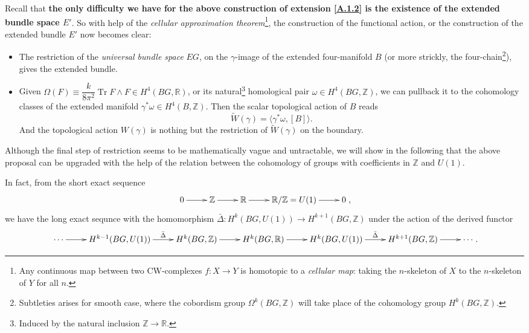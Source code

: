 \documentclass[10pt,nofootinbib,letterpaper]{revtex4}
\begin{document}
		Recall that \textbf{the only difficulty we have for the above construction of extension \eqref{A.1.2} is the existence of the extended bundle space $E'$}. So with help of the \emph{cellular approximation theorem}\footnote{Any continuous map between two CW-complexes $f:X\to Y$ is homotopic to a \emph{cellular map}: taking the $n$-skeleton of $X$ to the $n$-skeleton of $Y$ for all $n$.}, the construction of the functional action, or the construction of the extended bundle $E'$ now becomes clear:\par
		\begin{itemize}
			\item The restriction of the \emph{universal bundle space} $EG$, on the $\gamma$-image of the extended four-manifold $B$ (or more strickly, the four-chain\footnote{Subtleties arises for smooth case, where the cobordism group $\Omega^k(BG,\mathbb{Z})$ will take place of the cohomology group $H^k(BG,\mathbb{Z})$.}), gives the extended bundle. 
			\item Given $\Omega(F)\equiv\dfrac{k}{8\pi^2}\mathop{\mathrm{Tr}}F\wedge F\in H^4(BG,\mathbb{R})$, or its natural\footnote{Induced by the natural inclusion $\mathbb{Z}\rightarrow\mathbb{R}$.} homological pair $\omega\in H^4(BG,\mathbb{Z})$, we can pullback it to the cohomology classes of the extended manifold $\gamma^*\omega\in H^4(B,\mathbb{Z})$. Then the scalar topological action of $B$ reads
			\begin{equation*}
				\widetilde{W}(\gamma)=\langle\gamma^*\omega,[B]\rangle.
			\end{equation*}
			And the topological action $W(\gamma)$ is nothing but the restriction of $\widetilde{W}(\gamma)$ on the boundary.
		\end{itemize}
		Although the final step of restriction seems to be mathematically vague and untractable, we will show in the following that the above proposal can be upgraded with the help of the relation between the cohomology of groups with coefficients in $\mathbb{Z}$ and $U(1)$.\par
		In fact, from the short exact sequence
		\begin{equation*}
			\xymatrix{0\ar[r]&\mathbb{Z}\ar[r]&\mathbb{R}\ar[r]&\mathbb{R}/\mathbb{Z}=U(1)\ar[r]&0},
		\end{equation*}
		we have the long exact sequnce with the homomorphism $\bar{\Delta}:H^k(BG,U(1))\to H^{k+1}(BG,\mathbb{Z})$ under the action of the derived functor
		\begin{equation*} %
			\xymatrix{\cdots\ar[r] & H^{k-1}(BG,U(1))\ar[r]^-{\bar{\Delta}} & H^k(BG,\mathbb{Z})\ar[r] & H^k(BG,\mathbb{R})\ar[r] & H^k(BG,U(1))\ar[r]^-{\bar{\Delta}} & H^{k+1}(BG,\mathbb{Z})\ar[r]&\cdots}.
		\end{equation*}
\end{document}
